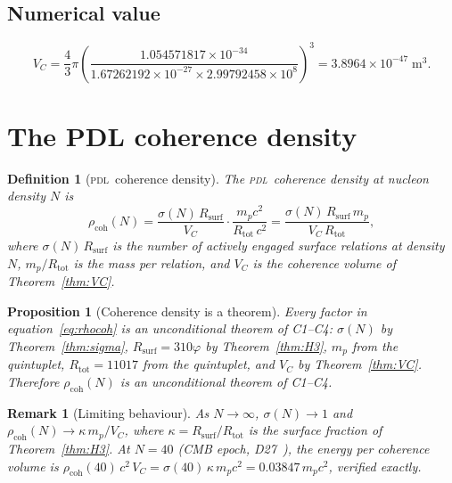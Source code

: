 \documentclass[12pt,a4paper]{article}
\newtheorem{proposition}[theorem]{Proposition}
\newtheorem{definition}[theorem]{Definition}
\newtheorem{remark}[theorem]{Remark}
\newcommand{\PDL}{\textsc{pdl}}
\newcommand{\rhocoh}{\rho_{\mathrm{coh}}}
\newcommand{\sig}{\sigma}
\newcommand{\Rsurf}{R_{\mathrm{surf}}}
\newcommand{\Rtot}{R_{\mathrm{tot}}}
\newcommand{\VC}{V_C}
\newcommand{\vp}{\varphi}
\begin{document}
\subsection{Numerical value}

\begin{equation}
\VC = \frac{4}{3}\pi\left(\frac{1.054571817\times10^{-34}}{1.67262192\times10^{-27}\times2.99792458\times10^8}\right)^3 = 3.8964\times10^{-47}\;\mathrm{m}^3.
\label{eq:VC_numerical}
\end{equation}

\section{The PDL coherence density}
\label{sec:rho}

\begin{definition}[\PDL\ coherence density]
\label{def:rhocoh}
The \PDL\ coherence density at nucleon density $N$ is
\begin{equation}
\rhocoh(N) = \frac{\sig(N)\,\Rsurf}{\VC}\cdot\frac{m_p c^2}{\Rtot\,c^2} = \frac{\sig(N)\,\Rsurf\,m_p}{\VC\,\Rtot},
\label{eq:rhocoh}
\end{equation}
where $\sig(N)\,\Rsurf$ is the number of actively engaged surface relations at density $N$, $m_p/\Rtot$ is the mass per relation, and $\VC$ is the coherence volume of Theorem~\ref{thm:VC}.
\end{definition}

\begin{proposition}[Coherence density is a theorem]
\label{prop:rhocoh}
Every factor in equation~\eqref{eq:rhocoh} is an unconditional theorem of C1--C4: $\sig(N)$ by Theorem~\ref{thm:sigma}, $\Rsurf = 310\vp$ by Theorem~\ref{thm:H3}, $m_p$ from the quintuplet, $\Rtot = 11017$ from the quintuplet, and $\VC$ by Theorem~\ref{thm:VC}. Therefore $\rhocoh(N)$ is an unconditional theorem of C1--C4.
\end{proposition}

\begin{remark}[Limiting behaviour]
As $N\to\infty$, $\sig(N)\to 1$ and $\rhocoh(N)\to\kappa\,m_p/\VC$, where $\kappa = \Rsurf/\Rtot$ is the surface fraction of Theorem~\ref{thm:H3}. At $N=40$ (CMB epoch, D27~\cite{PDL_D27_2026}), the energy per coherence volume is $\rhocoh(40)\,c^2\,\VC = \sig(40)\,\kappa\,m_p c^2 = 0.03847\,m_p c^2$, verified exactly.
\end{remark}
\end{document}
